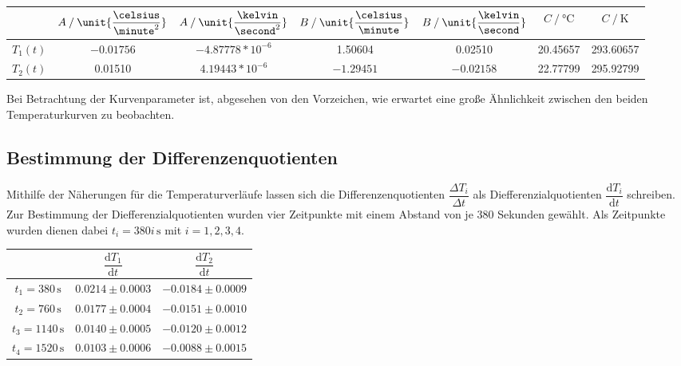 \begin{table}[H]
  \centering
  \label{tab:ApproxTemp}
  \begin{tabular}{S S S S S S[table-format=2.5] S[table-format=3.5]}
    \toprule
    & {$A \mathbin{/} \unit{\dfrac{\celsius}{\minute^2}}$} & {$A \mathbin{/} \unit{\dfrac{\kelvin}{\second^2}}$} 
    & {$B \mathbin{/} \unit{\dfrac{\celsius}{\minute}}$} & {$B \mathbin{/} \unit{\dfrac{\kelvin}{\second}}$} 
    & {$C \mathbin{/} \unit{\celsius}$} &  {$C \mathbin{/} \unit{\kelvin}$} \\
    \midrule
    {$T_1(t)$} & {$-0.01756$} &  {$-4.87778*10^{-6}$} & {1.50604} & {0.02510} & {20.45657} & {293.60657} \\
    {$T_2(t)$} & {0.01510} & {$4.19443*10^{-6}$} & {$-1.29451$} & {$-0.02158$} & {22.77799} & {295.92799} \\
    \bottomrule
  \end{tabular}
\end{table}
Bei Betrachtung der Kurvenparameter ist, abgesehen von den Vorzeichen, wie erwartet eine große Ähnlichkeit zwischen den
beiden Temperaturkurven zu beobachten.

\newpage

\subsection{Bestimmung der Differenzenquotienten}

Mithilfe der Näherungen für die Temperaturverläufe lassen sich die Differenzenquotienten $\dfrac{ΔT_i}{Δt}$ als Diefferenzialquotienten
$\dfrac{\text{d}T_i}{\text{d}t}$ schreiben.
Zur Bestimmung der Diefferenzialquotienten wurden vier Zeitpunkte mit einem Abstand von je 380 Sekunden gewählt.
Als Zeitpunkte wurden dienen dabei $t_i = 380i \, \unit{\second}$ mit $i=1,2,3,4$.

\begin{table}[H]
  \centering
  \label{tab:Diffquo}
  \begin{tabular}{S S S}
    \toprule
    & {$\dfrac{\text{d}T_1}{\text{d}t}$} & {$\dfrac{\text{d}T_2}{\text{d}t}$} \\
    \midrule
    {$t_1 = 380  \, \unit{\second}$} & {$0.0214 \pm 0.0003$} & {$-0.0184 \pm 0.0009$} \\
    {$t_2 = 760  \, \unit{\second}$} & {$0.0177 \pm 0.0004$} & {$-0.0151 \pm 0.0010$} \\
    {$t_3 = 1140 \, \unit{\second}$} & {$0.0140 \pm 0.0005$} & {$-0.0120 \pm 0.0012$} \\
    {$t_4 = 1520 \, \unit{\second}$} & {$0.0103 \pm 0.0006$} & {$-0.0088 \pm 0.0015$} \\
    \bottomrule
  \end{tabular}
\end{table}

